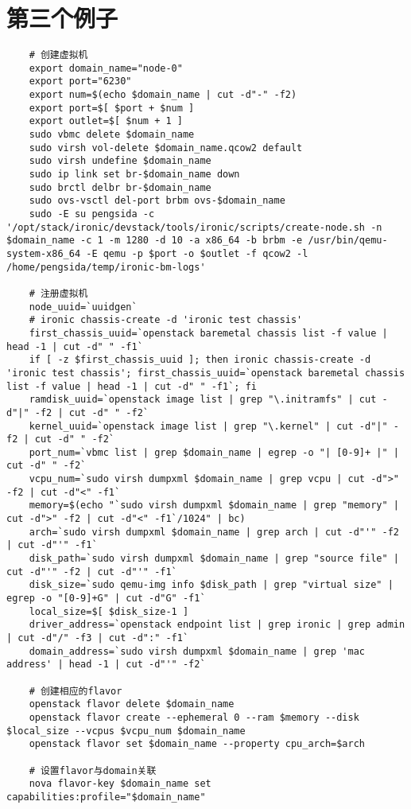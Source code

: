 \documentclass[a4paper,left=1.5cm,right=1.5cm,11pt]{article}
\begin{document}
\section{第三个例子}
	\begin{lstlisting}
	# 创建虚拟机
	export domain_name="node-0"
	export port="6230"
	export num=$(echo $domain_name | cut -d"-" -f2)
	export port=$[ $port + $num ]
	export outlet=$[ $num + 1 ]
	sudo vbmc delete $domain_name
	sudo virsh vol-delete $domain_name.qcow2 default
	sudo virsh undefine $domain_name
	sudo ip link set br-$domain_name down
	sudo brctl delbr br-$domain_name
	sudo ovs-vsctl del-port brbm ovs-$domain_name
	sudo -E su pengsida -c '/opt/stack/ironic/devstack/tools/ironic/scripts/create-node.sh -n $domain_name -c 1 -m 1280 -d 10 -a x86_64 -b brbm -e /usr/bin/qemu-system-x86_64 -E qemu -p $port -o $outlet -f qcow2 -l /home/pengsida/temp/ironic-bm-logs'

	# 注册虚拟机
	node_uuid=`uuidgen`
	# ironic chassis-create -d 'ironic test chassis'
	first_chassis_uuid=`openstack baremetal chassis list -f value | head -1 | cut -d" " -f1`
	if [ -z $first_chassis_uuid ]; then ironic chassis-create -d 'ironic test chassis'; first_chassis_uuid=`openstack baremetal chassis list -f value | head -1 | cut -d" " -f1`; fi
	ramdisk_uuid=`openstack image list | grep "\.initramfs" | cut -d"|" -f2 | cut -d" " -f2`
	kernel_uuid=`openstack image list | grep "\.kernel" | cut -d"|" -f2 | cut -d" " -f2`
	port_num=`vbmc list | grep $domain_name | egrep -o "| [0-9]+ |" | cut -d" " -f2`
	vcpu_num=`sudo virsh dumpxml $domain_name | grep vcpu | cut -d">" -f2 | cut -d"<" -f1`
	memory=$(echo "`sudo virsh dumpxml $domain_name | grep "memory" | cut -d">" -f2 | cut -d"<" -f1`/1024" | bc)
	arch=`sudo virsh dumpxml $domain_name | grep arch | cut -d"'" -f2 | cut -d"'" -f1`
	disk_path=`sudo virsh dumpxml $domain_name | grep "source file" | cut -d"'" -f2 | cut -d"'" -f1`
	disk_size=`sudo qemu-img info $disk_path | grep "virtual size" | egrep -o "[0-9]+G" | cut -d"G" -f1`
	local_size=$[ $disk_size-1 ]
	driver_address=`openstack endpoint list | grep ironic | grep admin | cut -d"/" -f3 | cut -d":" -f1`
	domain_address=`sudo virsh dumpxml $domain_name | grep 'mac address' | head -1 | cut -d"'" -f2`

	# 创建相应的flavor
	openstack flavor delete $domain_name
	openstack flavor create --ephemeral 0 --ram $memory --disk $local_size --vcpus $vcpu_num $domain_name
	openstack flavor set $domain_name --property cpu_arch=$arch

	# 设置flavor与domain关联
	nova flavor-key $domain_name set capabilities:profile="$domain_name"


\end{lstlisting}
\end{document}
